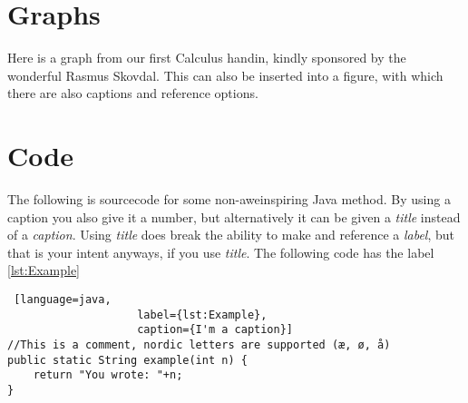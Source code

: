 \documentclass[a4, english, twoside]{article}
\begin{document}
\newpage
\section{Graphs}
Here is a graph from our first Calculus handin, kindly sponsored by the wonderful Rasmus Skovdal. \cite{rasmus} This can also be inserted into a figure, with which there are also captions and reference options.

\begin{center}
\end{center}

\section{Code}
The following is sourcecode for some non-aweinspiring Java method. By using a caption you also give it a number, but alternatively it can be given a \emph{title} instead of a \emph{caption}. Using \emph{title} does break the ability to make and reference a \emph{label}, but that is your intent anyways, if you use \emph{title}. The following code has the label \ref{lst:Example}

\begin{lstlisting} [language=java,
                    label={lst:Example},
                    caption={I'm a caption}]
//This is a comment, nordic letters are supported (æ, ø, å)
public static String example(int n) {
    return "You wrote: "+n;
}
\end{lstlisting}
\end{document}
